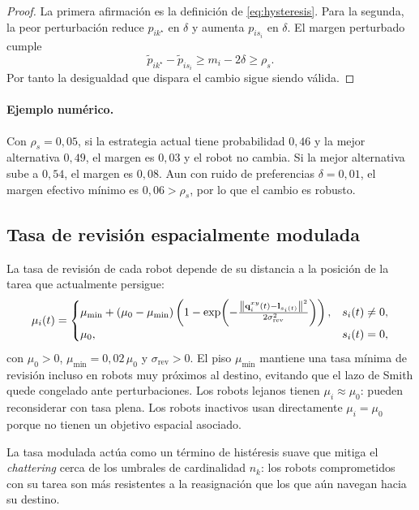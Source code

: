 \begin{proof}
La primera afirmación es la definición de \eqref{eq:hysteresis}. Para la segunda,
la peor perturbación reduce $p_{ik^\star}$ en $\delta$ y aumenta $p_{is_i}$ en
$\delta$. El margen perturbado cumple
\[
  \tilde p_{ik^\star}-\tilde p_{is_i}
  \ge
  m_i-2\delta
  \ge
  \rho_s.
\]
Por tanto la desigualdad que dispara el cambio sigue siendo válida.
\end{proof}

\paragraph{Ejemplo numérico.}
Con $\rho_s=0{,}05$, si la estrategia actual tiene probabilidad $0{,}46$ y la mejor
alternativa $0{,}49$, el margen es $0{,}03$ y el robot no cambia. Si la mejor
alternativa sube a $0{,}54$, el margen es $0{,}08$. Aun con ruido de preferencias
$\delta=0{,}01$, el margen efectivo mínimo es $0{,}06>\rho_s$, por lo que el cambio es
robusto.

\subsection{Tasa de revisión espacialmente modulada}

La tasa de revisión de cada robot depende de su distancia a la posición de la
tarea que actualmente persigue:
\begin{equation}
  \mu_i(t) =
  \begin{cases}
  \mu_{\min} + (\mu_0 - \mu_{\min})
    \left(1 - \exp\!\left(-\frac{\left\|\mathbf{q}_i^{xy}(t) -
    \mathbf{l}_{s_i(t)}\right\|^2}{2\sigma_{\text{rev}}^2}\right)\right),
    & s_i(t)\neq 0,\\
  \mu_0, & s_i(t)=0,
  \end{cases}
  \label{eq:revision_rate}
\end{equation}
con $\mu_0 > 0$, $\mu_{\min} = 0{,}02\,\mu_0$ y $\sigma_{\text{rev}} > 0$.
El piso $\mu_{\min}$ mantiene una tasa mínima de revisión incluso en robots muy
próximos al destino, evitando que el lazo de Smith quede congelado ante perturbaciones. Los robots lejanos tienen $\mu_i \approx \mu_0$:
pueden reconsiderar con tasa plena. Los robots inactivos usan directamente
$\mu_i = \mu_0$ porque no tienen un objetivo espacial asociado.

La tasa modulada actúa como un término de histéresis suave que mitiga el
\emph{chattering} cerca de los umbrales de cardinalidad $n_k$: los robots comprometidos
con su tarea son más resistentes a la reasignación que los que aún navegan
hacia su destino.

